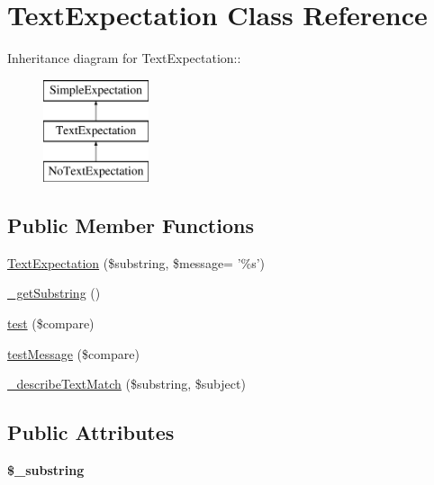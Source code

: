 \hypertarget{class_text_expectation}{
\section{TextExpectation Class Reference}
\label{class_text_expectation}
}
Inheritance diagram for TextExpectation::\begin{figure}[H]
\begin{center}
\leavevmode
\includegraphics[height=3cm]{class_text_expectation}
\end{center}
\end{figure}
\subsection*{Public Member Functions}
\begin{DoxyCompactItemize}
\item 
\hyperlink{class_text_expectation_a2305ea4ee24e0c0672af8605f25a524b}{TextExpectation} (\$substring, \$message= '\%s')
\item 
\hyperlink{class_text_expectation_a2569a76d2367fa368af6de6441930c53}{\_\-getSubstring} ()
\item 
\hyperlink{class_text_expectation_a352a2a95ccf1c29c886b7608338d3c20}{test} (\$compare)
\item 
\hyperlink{class_text_expectation_ab76e87201a16eb23fbb1fbafc24b51cf}{testMessage} (\$compare)
\item 
\hyperlink{class_text_expectation_aa2dce89d22209c3046dc9f5c994f0de3}{\_\-describeTextMatch} (\$substring, \$subject)
\end{DoxyCompactItemize}
\subsection*{Public Attributes}
\begin{DoxyCompactItemize}
\item 
\hypertarget{class_text_expectation_a7041132e555a195528300b856cd8906d}{
{\bfseries \$\_\-substring}}
\label{class_text_expectation_a7041132e555a195528300b856cd8906d}

\end{DoxyCompactItemize}


